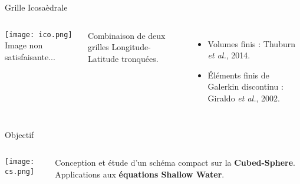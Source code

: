 \documentclass[11pt]{beamer}
\begin{document}
\begin{frame}{Grille Icosaèdrale}
\begin{columns}
\begin{center}
\texttt{[image: ico.png]}
Image non satisfaisante...
\end{center}

Combinaison de deux grilles Longitude-Latitude tronquées.

\begin{itemize}
\item Volumes finis : Thuburn \textit{et al.}, 2014.
\item Éléments finis de Galerkin discontinu : Giraldo \textit{et al.}, 2002.
\end{itemize}
\end{columns}
\end{frame}



\begin{frame}{Objectif}
\begin{columns}
\begin{center}
\texttt{[image: cs.png]}
\end{center}


\begin{block}{}
Conception et étude d'un schéma compact sur la \textbf{Cubed-Sphere}. Applications aux \textbf{équations Shallow Water}.
\end{block}


\end{columns}
\end{frame}

\end{document}

